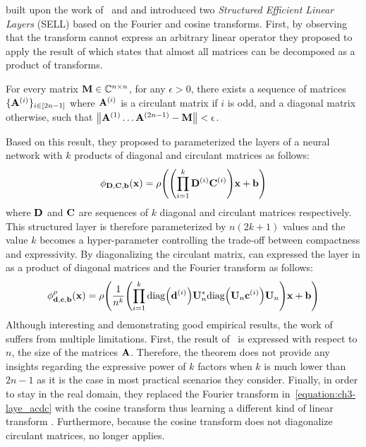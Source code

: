 \citet{moczulski2016acdc} built upon the work of~\citet{cheng2015exploration} and \citet{huhtanen2015factoring} and introduced two \emph{Structured Efficient Linear Layers} (SELL) based on the Fourier and cosine transforms.
First, by observing that the \DC transform cannot express an arbitrary linear operator they proposed to apply the result of \citet{huhtanen2015factoring} which states that almost all matrices can be decomposed as a product of \DC transforms.
\begin{theorem} \label{theorem:ch3-huhtanen}
  For every matrix $\mathbf{M} \in \mathbb{C}^{n \times n}$, for any $\epsilon > 0$, there exists a sequence of matrices $\{ \mathbf{A}^{(i)} \}_{i \in [2n-1]}$ where $\mathbf{A}^{(i)}$ is a circulant matrix if $i$ is odd, and a diagonal matrix otherwise, such that $\norm{\mathbf{A}^{(1)} \ldots \mathbf{A}^{(2n-1)} - \mathbf{M}} < \epsilon$.
\end{theorem}
\noindent
Based on this result, they proposed to parameterized the layers of a neural network with $k$ products of diagonal and circulant matrices as follows:
\begin{equation} \label{equation:acdc_layer}
  \layer_{\Dmat, \Cmat, \bvec} (\xvec) = \act \left( \left(\prod_{i = 1}^{k} \Dmat^{(i)} \Cmat^{(i)} \right) \xvec + \bvec \right)
\end{equation}
where $\mathbf{D}$ and $\mathbf{C}$ are sequences of $k$ diagonal and circulant matrices respectively.
This structured layer is therefore parameterized by $n(2k+1)$ values and the value $k$ becomes a hyper-parameter controlling the trade-off between compactness and expressivity. 
By diagonalizing the circulant matrix, \citet{moczulski2016acdc} can expressed the layer in  as a product of diagonal matrices and the Fourier transform as follows:
\begin{equation} \label{equation:ch3-laye_acdc}
  \layer^\act_{\dvec, \cvec, \bvec} (\xvec) = \act \left(\frac{1}{n^k} \left(\prod_{i = 1}^{k} \diag\left(\dvec^{(i)}\right) \Umat_n^* \diag\left(\Umat_n \cvec^{(i)}\right) \Umat_n \right) \xvec + \bvec \right)
\end{equation}
\noindent
Although interesting and demonstrating good empirical results, the work of~\citet{moczulski2016acdc} suffers from multiple limitations. 
First, the result of~\citet{huhtanen2015factoring} is expressed with respect to $n$, the size of the matrices $\mathbf{A}$.
Therefore, the theorem does not provide any insights regarding the expressive power of $k$ factors when $k$ is much lower than $2n-1$ as it is the case in most practical scenarios they consider.
Finally, in order to stay in the real domain, they replaced the Fourier transform in~\cref{equation:ch3-laye_acdc} with the cosine transform thus learning a different kind of linear transform \cite{sanchez1995diagonalizing}.
Furthermore, because the cosine transform does not diagonalize circulant matrices,  no longer applies.

